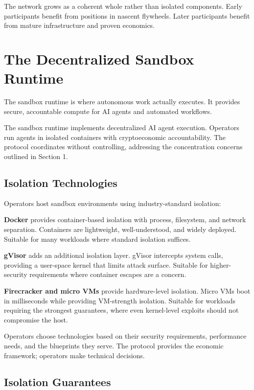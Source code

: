 \documentclass[11pt,a4paper]{article}
\begin{document}
The network grows as a coherent whole rather than isolated components. Early participants benefit from positions in nascent flywheels. Later participants benefit from mature infrastructure and proven economics.

\section{The Decentralized Sandbox Runtime}

The sandbox runtime is where autonomous work actually executes. It provides secure, accountable compute for AI agents and automated workflows.

The sandbox runtime implements decentralized AI agent execution. Operators run agents in isolated containers with cryptoeconomic accountability. The protocol coordinates without controlling, addressing the concentration concerns outlined in Section 1.

\subsection{Isolation Technologies}

Operators host sandbox environments using industry-standard isolation:

\textbf{Docker} provides container-based isolation with process, filesystem, and network separation. Containers are lightweight, well-understood, and widely deployed. Suitable for many workloads where standard isolation suffices.

\textbf{gVisor} adds an additional isolation layer. gVisor intercepts system calls, providing a user-space kernel that limits attack surface. Suitable for higher-security requirements where container escapes are a concern.

\textbf{Firecracker and micro VMs} provide hardware-level isolation. Micro VMs boot in milliseconds while providing VM-strength isolation. Suitable for workloads requiring the strongest guarantees, where even kernel-level exploits should not compromise the host.

Operators choose technologies based on their security requirements, performance needs, and the blueprints they serve. The protocol provides the economic framework; operators make technical decisions.

\subsection{Isolation Guarantees}
\end{document}
